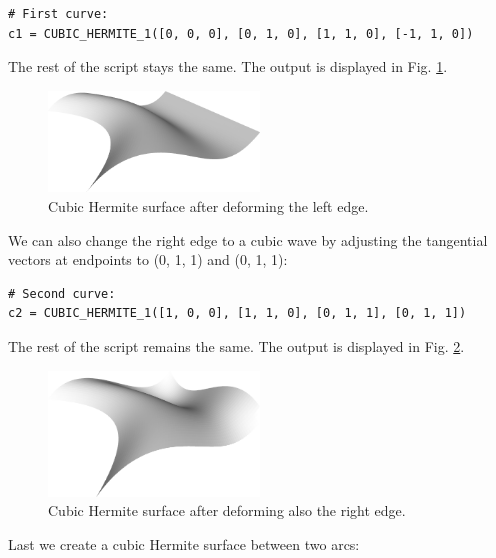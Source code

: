 \begin{bbox}
\begin{verbatim}
# First curve:
c1 = CUBIC_HERMITE_1([0, 0, 0], [0, 1, 0], [1, 1, 0], [-1, 1, 0])
\end{verbatim}
\end{bbox}
\vspace{6mm}

\noindent
The rest of the script stays the same. The output is displayed in Fig. \ref{fig:curves-14c}.

\begin{figure}[!ht]
\begin{center}
\includegraphics[width=0.5\textwidth]{img/curves-14c.png}
\end{center}
\vspace{-6mm}
\caption{Cubic Hermite surface after deforming the left edge.}
\label{fig:curves-14c}
\end{figure}
\noindent
We can also change the right edge to a cubic wave by adjusting 
the tangential vectors at endpoints to (0, 1, 1) and (0, 1, 1):\\

\begin{bbox}
\begin{verbatim}
# Second curve:
c2 = CUBIC_HERMITE_1([1, 0, 0], [1, 1, 0], [0, 1, 1], [0, 1, 1])
\end{verbatim}
\end{bbox}
\vspace{6mm}

\noindent
The rest of the script remains the same. The output is displayed in Fig. \ref{fig:curves-14d}.

\begin{figure}[!ht]
\begin{center}
\includegraphics[width=0.5\textwidth]{img/curves-14d.png}
\end{center}
\vspace{-6mm}
\caption{Cubic Hermite surface after deforming also the right edge.}
\label{fig:curves-14d}
\end{figure}
\noindent
\noindent
Last we create a cubic Hermite surface between two arcs:\\

